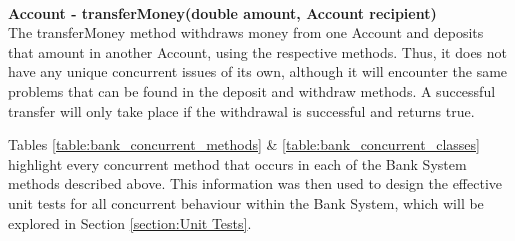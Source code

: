 \documentclass[a4paper,12pt]{article}
\begin{document}
\textbf{\\Account - transferMoney(double amount, Account recipient)}
\\The transferMoney method withdraws money from one Account and deposits that amount in another Account, using the respective methods. Thus, it does not have any unique concurrent issues of its own, although it will encounter the same problems that can be found in the deposit and withdraw methods. A successful transfer will only take place if the withdrawal is successful and returns true.

Tables \ref{table:bank_concurrent_methods} \& \ref{table:bank_concurrent_classes} highlight every concurrent method that occurs in each of the Bank System methods described above. This information was then used to design the effective unit tests for all concurrent behaviour within the Bank System, which will be explored in Section \ref{section:Unit Tests}.
\end{document}
